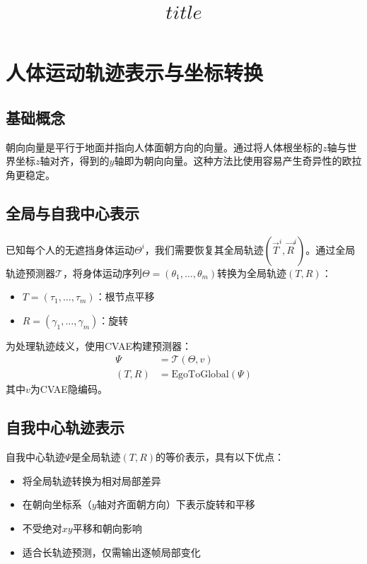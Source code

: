 \documentclass[UTF8]{ctexart}
\title{$title$}
\begin{document}
\maketitle

{%

\section*{人体运动轨迹表示与坐标转换}

\subsection*{基础概念}
朝向向量是平行于地面并指向人体面朝方向的向量。通过将人体根坐标的$z$轴与世界坐标$z$轴对齐，得到的$y$轴即为朝向向量。这种方法比使用容易产生奇异性的欧拉角更稳定。

\subsection*{全局与自我中心表示}
已知每个人的无遮挡身体运动$\Theta^i$，我们需要恢复其全局轨迹$(\vec{T}^i, \vec{R}^i)$。通过全局轨迹预测器$\mathcal{T}$，将身体运动序列$\Theta = (\theta_1,\ldots,\theta_m)$转换为全局轨迹$(T, R)$：
\begin{itemize}
    \item $T = (\tau_1,\ldots,\tau_m)$：根节点平移
    \item $R = (\gamma_1,\ldots,\gamma_m)$：旋转
\end{itemize}

为处理轨迹歧义，使用CVAE构建预测器：
\begin{align}
    \Psi &= \mathcal{T}(\Theta,v) \tag{1} \\
    (T, R) &= \text{EgoToGlobal}(\Psi) \tag{2}
\end{align}
其中$v$为CVAE隐编码。

\subsection*{自我中心轨迹表示}
自我中心轨迹$\Psi$是全局轨迹$(T, R)$的等价表示，具有以下优点：
\begin{itemize}
    \item 将全局轨迹转换为相对局部差异
    \item 在朝向坐标系（$y$轴对齐面朝方向）下表示旋转和平移
    \item 不受绝对$xy$平移和朝向影响
    \item 适合长轨迹预测，仅需输出逐帧局部变化
\end{itemize}

}
\end{document}
